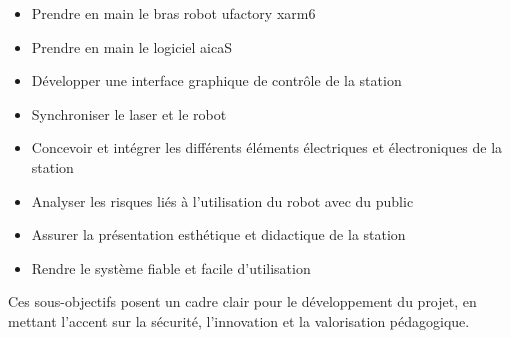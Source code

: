 \begin{itemize}
    \item Prendre en main le bras robot \gls{ufactory} \gls{xarm6}
    \item Prendre en main le logiciel \gls{aicaS}
    \item Développer une interface graphique de contrôle de la station
    \item Synchroniser le laser et le robot
    \item Concevoir et intégrer les différents éléments électriques et électroniques de la station
    \item Analyser les risques liés à l'utilisation du robot avec du public
    \item Assurer la présentation esthétique et didactique de la station
    \item Rendre le système fiable et facile d'utilisation
\end{itemize}

Ces sous-objectifs posent un cadre clair pour le développement du projet, en mettant l'accent sur la sécurité, l'innovation et la valorisation pédagogique.


